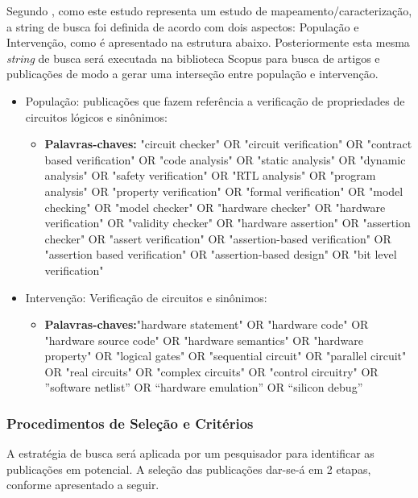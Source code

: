Segundo , como este estudo representa um estudo de mapeamento/caracterização, a string de busca foi definida de acordo com dois aspectos: População e Intervenção, como é apresentado na estrutura abaixo. Posteriormente esta mesma \textit{string} de busca será executada na biblioteca Scopus para busca de artigos e publicações de modo a gerar uma interseção entre população e intervenção.
\begin{itemize}
\item População: publicações que fazem referência a verificação de propriedades de circuitos lógicos e sinônimos:
	\begin{itemize}
	\item \textbf{Palavras-chaves:} "circuit checker" OR "circuit verification" OR "contract based verification" OR "code analysis" OR "static analysis" OR "dynamic analysis" OR "safety verification" OR "RTL analysis" OR "program analysis" OR "property verification" OR "formal verification" OR "model checking" OR "model checker" OR "hardware checker" OR "hardware verification" OR "validity checker" OR "hardware assertion" OR "assertion checker" OR "assert verification" OR "assertion-based verification" OR "assertion based verification" OR "assertion-based design" OR "bit level verification"
	\end{itemize}
\item Intervenção: Verificação de circuitos e sinônimos:
	\begin{itemize}
	\item \textbf{Palavras-chaves:}"hardware statement" OR "hardware code" OR "hardware source code" OR "hardware semantics" OR "hardware property" OR "logical gates" OR "sequential circuit" OR "parallel circuit" OR "real circuits" OR "complex circuits" OR "control circuitry" OR ”software netlist” OR “hardware emulation” OR “silicon debug”
	\end{itemize}
\end{itemize}

\subsubsection{Procedimentos de Seleção e Critérios}

\par
A estratégia de busca será aplicada por um pesquisador para identificar as publicações em potencial. A seleção das publicações dar-se-á em 2 etapas, conforme apresentado a seguir.

